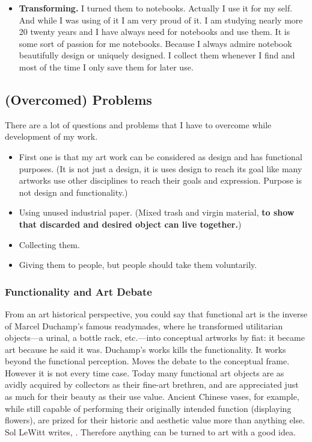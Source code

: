 \begin{itemize}
\item \textbf{Transforming.} I turned them to notebooks. Actually I use it for my self. And while I was using of it I am very proud of it. I am studying nearly more 20 twenty years and I have always need for notebooks and use them. It is some sort of passion for me notebooks. Because I always admire notebook beautifully design or uniquely designed. I collect them whenever I find and most of the time I only save them for later use. 
\end{itemize}

\subsection{(Overcomed) Problems}
There are a lot of questions and problems that I have to overcome while development of my work. 
\begin{itemize}
\item First one is that my art work can be considered as design and has functional purposes. (It is not just a design, it is uses design to reach its goal like many artworks use other disciplines to reach their goals and expression. Purpose is not design and functionality.)
\item Using unused industrial paper. (Mixed trash and virgin material, \textbf{to show that discarded and desired object can live together.})
\item Collecting them.
\item Giving them to people, but people should take them voluntarily.
\end{itemize}

%
\subsubsection{Functionality and Art Debate}
From an art historical perspective, you could say that functional art is the inverse of Marcel Duchamp's famous readymades, where he transformed utilitarian objects---a urinal, a bottle rack, etc.---into conceptual artworks by fiat: it became art because he said it was. Duchamp's works kills the functionality. It works beyond the functional perception. Moves the debate to the conceptual frame. However it is not every time case. Today many functional art objects are as avidly acquired by collectors as their fine-art brethren, and are appreciated just as much for their beauty as their use value. Ancient Chinese vases, for example, while still capable of performing their originally intended function (displaying flowers), are prized for their historic and aesthetic value more than anything else.  Sol LeWitt writes,  \cite{lewitt1967paragraphs}. Therefore anything can be turned to art with a good idea. 

